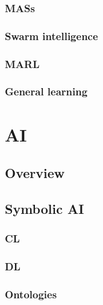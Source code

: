 \documentclass[12pt,a4paper,openright,twoside]{book}
\begin{document}
\subsection{\Aclp{MAS}}\label{subsec:mas}

\subsection{Swarm intelligence}\label{subsec:swarm-intelligence}

\subsection{\Acl{MARL}}\label{subsec:marl}

\subsection{General learning}\label{subsec:general-learning}


\chapter{\Acl{AI}}\label{ch:ai}

\section{Overview}\label{sec:ai-overview}

\section{Symbolic \ac{AI}}\label{sec:symbolic-ai}

\subsection{\Acl{CL}}\label{subsec:cl}

\subsection{\Acl{DL}}\label{subsec:dl}

\subsection{Ontologies}\label{subsec:ontologies}
\end{document}
